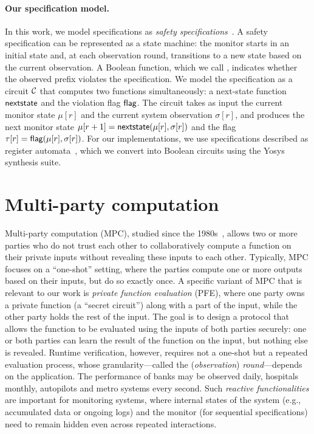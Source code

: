 \paragraph{Our specification model.}
In this work, we model specifications as \emph{safety specifications}~\cite{KKLSV02}. A safety specification can be represented as a state machine: the monitor starts in an initial state and, at each observation round, transitions to a new state based on the current observation. A Boolean function, which we call \isbad, indicates whether the observed prefix violates the specification. We model the specification as a circuit $\mathcal{C}$ that computes two functions simultaneously: a next-state function $\textsf{nextstate}$ and the violation flag $\textsf{flag}$. The circuit takes as input the current monitor state $\mu[r]$ and the current system observation $\sigma[r]$, and produces the next monitor state $\mu[r+1] = \textsf{nextstate}(\mu[r], \sigma[r])$ and the flag $\tau[r] = \textsf{flag}(\mu[r], \sigma[r])$. For our implementations, we use specifications described as register automata~\cite{GDPT13}, which we convert into Boolean circuits using the Yosys synthesis suite.

\section{Multi-party computation}\label{sec:mpc}

Multi-party computation (MPC), studied since the 1980s~\cite{Yao82}, allows two or more parties who do not trust each other to collaboratively compute a function on their private inputs without revealing these inputs to each other. Typically, MPC focuses on a ``one-shot'' setting, where the parties compute one or more outputs based on their inputs, but do so exactly once. A specific variant of MPC that is relevant to our work is \emph{private function evaluation} (PFE), where one party owns a private function (a ``secret circuit'') along with a part of the input, while the other party holds the rest of the input. The goal is to design a protocol that allows the function to be evaluated using the inputs of both parties securely: one or both parties can learn the result of the function on the input, but nothing else is revealed. Runtime verification, however, requires not a one-shot but a repeated evaluation process, whose granularity---called the (\emph{observation}) \emph{round}---depends on the application. The performance of banks may be observed daily, hospitals monthly, autopilots and metro systems every second. Such \emph{reactive functionalities} are important for monitoring systems, where internal states of the system (e.g., accumulated data or ongoing logs) and the monitor (for sequential specifications) need to remain hidden even across repeated interactions.

